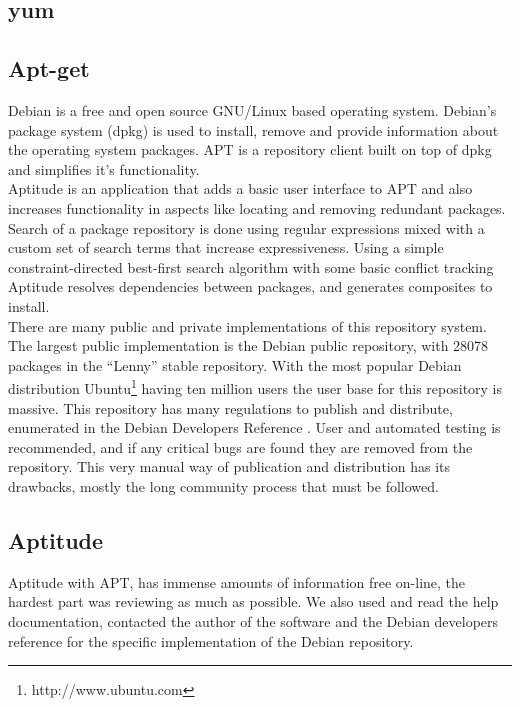 \subsection{yum}

\subsection{Apt-get}

Debian is a free and open source GNU/Linux based operating system. 
Debian's package system (dpkg) is used to install, remove and provide information about the operating system packages. 
APT is a repository client built on top of dpkg and simplifies it's functionality.\\
Aptitude is an application that adds a basic user interface to APT and also increases functionality in aspects like 
locating and removing redundant packages. 
Search of a package repository is done using regular expressions mixed with a
custom set of search terms that increase expressiveness. Using a simple
constraint-directed best-first search algorithm with some basic conflict
tracking Aptitude resolves dependencies between packages, and generates
composites to install.\\ 
There are many public and private implementations of this repository system. 
The largest public implementation is the Debian public repository, with 28078 packages in the ``Lenny'' stable repository.
With the most popular Debian distribution Ubuntu\footnote{http://www.ubuntu.com} having ten million users \cite{vance_software_2009} the user base for this repository is massive.
This repository has many regulations to publish and distribute, enumerated in the Debian Developers Reference \cite{andreas_barth_debian_2008}. 
User and automated testing is recommended, and if any critical bugs are found they are removed from the repository. 
This very manual way of publication and
distribution has its drawbacks, mostly the long community process that must be followed.\\

\subsection{Aptitude}
Aptitude with APT, has immense amounts of information free on-line, the hardest part was reviewing as much as possible.
We also used and read the help documentation, contacted the author of the software \cite{burrows_modelling_2005} and
the Debian developers reference for the specific implementation of the Debian repository.

